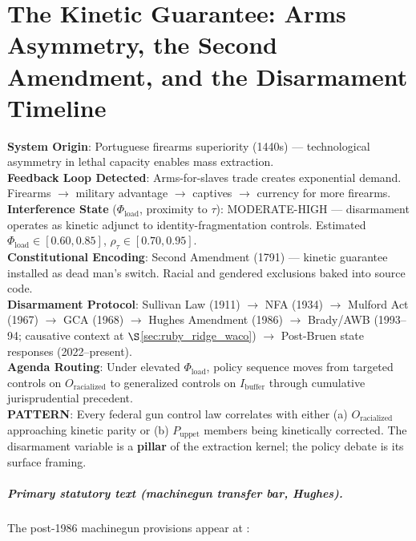 \chapter{The Kinetic Guarantee: Arms Asymmetry, the Second Amendment, and the Disarmament Timeline}
\label{ch:kinetic}

\begin{tcolorbox}[colback=black!5, colframe=black!70, fonttitle=\bfseries\ttfamily, title=RUNTIME LOG: TRACING THE DISARMAMENT VARIABLE ACROSS THE FULL TIMELINE]
\ttfamily\small
\textbf{System Origin}: Portuguese firearms superiority (1440s) --- technological asymmetry in lethal capacity enables mass extraction.\\
\textbf{Feedback Loop Detected}: Arms-for-slaves trade creates exponential demand. Firearms $\rightarrow$ military advantage $\rightarrow$ captives $\rightarrow$ currency for more firearms.\\
\textbf{Interference State} ($\Phi_{\text{load}}$, proximity to $\tau$): MODERATE-HIGH --- disarmament operates as kinetic adjunct to identity-fragmentation controls. Estimated $\Phi_{\text{load}} \in [0.60, 0.85]$, $\rho_{\tau} \in [0.70, 0.95]$.\\
\textbf{Constitutional Encoding}: Second Amendment (1791) --- kinetic guarantee installed as dead man's switch. Racial and gendered exclusions baked into source code.\\
\textbf{Disarmament Protocol}: Sullivan Law (1911) $\rightarrow$ NFA (1934) $\rightarrow$ Mulford Act (1967) $\rightarrow$ GCA (1968) $\rightarrow$ Hughes Amendment (1986) $\rightarrow$ Brady/AWB (1993--94; causative context at $\S$\ref{sec:ruby_ridge_waco}) $\rightarrow$ Post-Bruen state responses (2022--present).\\
\textbf{Agenda Routing}: Under elevated $\Phi_{\text{load}}$, policy sequence moves from targeted controls on $O_{\text{racialized}}$ to generalized controls on $I_{\text{buffer}}$ through cumulative jurisprudential precedent.\\
\textbf{PATTERN}: Every federal gun control law correlates with either (a) $O_{\text{racialized}}$ approaching kinetic parity or (b) $P_{\text{uppet}}$ members being kinetically corrected. The disarmament variable is a \textbf{pillar} of the extraction kernel; the policy debate is its surface framing.
\end{tcolorbox}

\paragraph{Primary statutory text (machinegun transfer bar, Hughes).}
The post-1986 machinegun provisions appear at :

